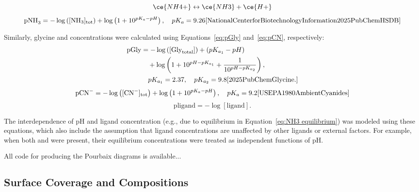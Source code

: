 \begin{equation} \label{eq:NH3 equilibrium}
\ce{NH4+} \leftrightarrow \ce{NH3} + \ce{H+}
\end{equation}
\begin{equation} \label{eq:pNH3}
\text{pNH}_3 = -\log \left([\text{NH}_3]_{\text{tot}}\right) + \log \left(1 + 10^{pK_a - pH} \right), \quad pK_a = 9.26 \cite{NationalCenterforBiotechnologyInformation2025PubChemHSDB}
\end{equation}

Similarly, glycine and  concentrations were calculated using Equations~\eqref{eq:pGly} and~\eqref{eq:pCN}, respectively:
\begin{align} \label{eq:pGly}
\text{pGly} &= -\log \left([\text{Gly}_{\text{total}}]\right) + (pK_{a_1} - pH) \nonumber \\
&\quad + \log \left(1 + 10^{pH - pK_{a_1}} + \frac{1}{10^{pH - pK_{a_2}}} \right), \nonumber \\
&\quad pK_{a_1} = 2.37, \quad pK_{a_2} = 9.8 \cite{2025PubChemGlycine.}
\end{align}
\begin{equation} \label{eq:pCN}
\text{pCN}^- = -\log \left([\text{CN}^-]_{\text{tot}}\right) + \log \left(1 + 10^{pK_a - pH} \right), \quad pK_a = 9.2 \cite{USEPA1980AmbientCyanides}
\end{equation}
\begin{equation} \label{eq:pligand}
\text{pligand} = -\log[\text{ligand}].
\end{equation}

The interdependence of pH and ligand concentration (e.g., due to  equilibrium in Equation~\eqref{eq:NH3 equilibrium}) was modeled using these equations, which also include the assumption that ligand concentrations are unaffected by other ligands or external factors. For example, when both  and  were present, their equilibrium concentrations were treated as independent functions of pH.

All code for producing the Pourbaix diagrams is available...

\subsection{Surface Coverage and Compositions}

